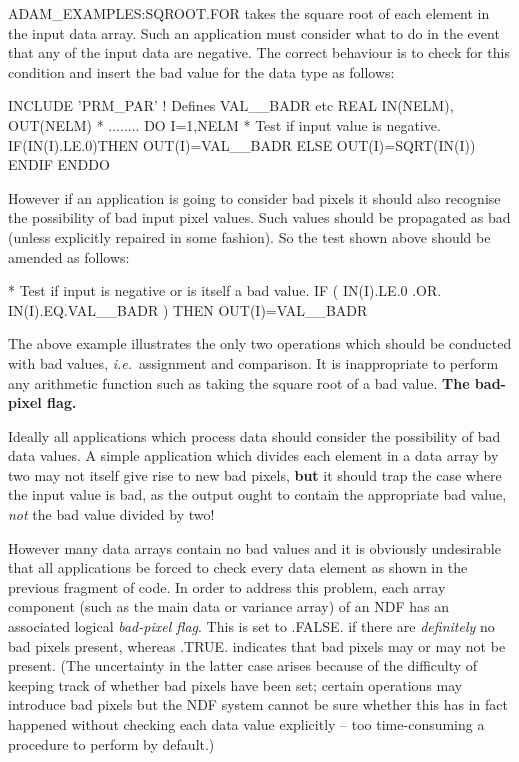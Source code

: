 \documentclass[twoside,11pt,nolof]{starlink}
\begin{document}
ADAM\_EXAMPLES:SQROOT.FOR takes the square root of each element
in the input data array.
Such an application must consider what to do in the event that any of the
input data are negative.
The correct behaviour is to check for this condition and insert the
bad value for the data type as follows:
\begin{terminalv}
      INCLUDE 'PRM_PAR'                      ! Defines VAL__BADR etc
      REAL IN(NELM), OUT(NELM)
*   ........
      DO I=1,NELM
*      Test if input value is negative.
         IF(IN(I).LE.0)THEN
            OUT(I)=VAL__BADR
         ELSE
            OUT(I)=SQRT(IN(I))
         ENDIF
      ENDDO
\end{terminalv}
However if an application is going to consider bad pixels it should also
recognise the possibility of bad input pixel values. Such values should be
propagated as bad (unless explicitly repaired in some fashion).
So the test shown above should be amended as follows:
\begin{terminalv}
*    Test if input is negative or is itself a bad value.
         IF ( IN(I).LE.0 .OR. IN(I).EQ.VAL__BADR ) THEN
            OUT(I)=VAL__BADR
\end{terminalv}
The above example illustrates the only two operations which should be conducted
with bad values, \textit{i.e.}\ assignment and comparison.
It is inappropriate to perform any arithmetic function such as taking
the square root of a bad value.
\newpage
{\large\bf The bad-pixel flag.}

Ideally all applications which process data should consider the possibility of
bad data values. A simple application which divides each element in
a data array by two may not
itself give rise to new bad pixels, \textbf{but} it should trap the case where the
input value is bad, as the output ought to contain the appropriate bad value,
{\sl not\/} the bad value divided by two!

However many data arrays contain no bad values and it is obviously
undesirable that all applications be forced to check every data
element as shown in  the previous fragment of code.
In order to address this problem, each array component (such as
the main data or variance array) of an NDF has an
associated logical {\sl bad-pixel flag}.
This is set to .FALSE. if there are {\sl definitely\/} no bad pixels present,
whereas .TRUE. indicates that bad pixels may or may not be present.
(The uncertainty in the latter case arises because of the difficulty
of keeping track of whether bad pixels have been set;
certain operations  may introduce bad pixels but
the NDF system cannot be sure whether this has in fact happened without checking
each data value explicitly -- too time-consuming a procedure
to perform by default.)
\end{document}

